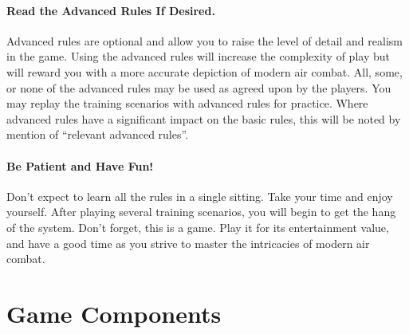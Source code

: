 {\paragraph{Read the Advanced Rules If Desired.} Advanced rules are optional and allow you to raise the level of detail and realism in the game. Using the advanced rules will increase the complexity of play but will reward you with a more accurate depiction of modern air combat. All, some, or none of the advanced rules may be used as agreed upon by the players. You may replay the training scenarios with advanced rules for practice. Where advanced rules have a significant impact on the basic rules, this will be noted by mention of “relevant advanced rules”. 

\paragraph{Be Patient and Have Fun!} Don’t expect to learn all the rules in a single sitting. Take your time and enjoy yourself. After playing several training scenarios, you will begin to get the hang of the system. Don’t forget, this is a game. Play it for its entertainment value, and have a good time as you strive to master the intricacies of modern air combat.

}

\section{Game Components}

